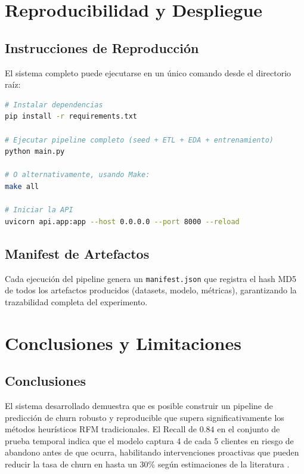 \documentclass[12pt, letterpaper]{article}
\begin{document}
\section{Reproducibilidad y Despliegue}

\subsection{Instrucciones de Reproducción}

El sistema completo puede ejecutarse en un único comando desde el directorio raíz:

\begin{lstlisting}[language=bash, caption=Comandos de reproducción del sistema.]
# Instalar dependencias
pip install -r requirements.txt

# Ejecutar pipeline completo (seed + ETL + EDA + entrenamiento)
python main.py

# O alternativamente, usando Make:
make all

# Iniciar la API
uvicorn api.app:app --host 0.0.0.0 --port 8000 --reload
\end{lstlisting}

\subsection{Manifest de Artefactos}

Cada ejecución del pipeline genera un \texttt{manifest.json} que registra
el hash MD5 de todos los artefactos producidos (datasets, modelo, métricas),
garantizando la trazabilidad completa del experimento.

\section{Conclusiones y Limitaciones}

\subsection{Conclusiones}

El sistema desarrollado demuestra que es posible construir un pipeline de
predicción de churn robusto y reproducible que supera significativamente los
métodos heurísticos RFM tradicionales. El Recall de $0.84$ en el conjunto
de prueba temporal indica que el modelo captura 4 de cada 5 clientes en
riesgo de abandono antes de que ocurra, habilitando intervenciones proactivas
que pueden reducir la tasa de churn en hasta un 30\% según estimaciones de
la literatura \citep{verbeke2012new}.
\end{document}
